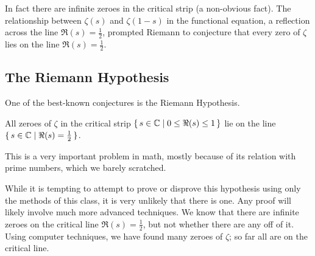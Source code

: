 \begin{center}
\end{center}

In fact there are infinite zeroes in the critical strip (a non-obvious fact). The relationship between $\zeta(s)$ and $\zeta(1-s)$ in the functional equation, a reflection across the line $\Re(s) = \frac{1}{2}$, prompted Riemann to conjecture that every zero of $\zeta$ lies on the line $\Re(s) = \frac{1}{2}$.

\subsection{The Riemann Hypothesis}

One of the best-known conjectures is the Riemann Hypothesis.

\begin{hypothesis}[Riemann]
All zeroes of $\zeta$ in the critical strip $\set{ s\in \mathbb{C}\mid 0 \leq \Re(s) \leq 1}$ lie on the line $\set{ s\in \mathbb{C}\mid \Re(s) = \frac{1}{2}}$.
\end{hypothesis}

This is a very important problem in math, mostly because of its relation with prime numbers, which we barely scratched.

\begin{remark}
While it is tempting to attempt to prove or disprove this hypothesis using only the methods of this class, it is very unlikely that there is one. Any proof will likely involve much more advanced techniques. We know that there are infinite zeroes on the critical line $\Re(s) = \frac{1}{2}$, but not whether there are any off of it. Using computer techniques, we have found many zeroes of $\zeta$; so far all are on the critical line.
\end{remark}